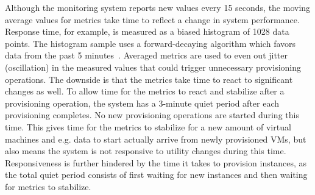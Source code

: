 \documentclass[english]{tktltiki2}
\theoremstyle{definition}
\theoremstyle{remark}
\begin{document}
Although the monitoring system reports new values every 15 seconds, the moving
average values for metrics take time to reflect a change in system
performance. Response time, for example, is measured as a biased histogram of
1028 data points. The histogram sample uses a forward-decaying algorithm which
favors data from the past 5
minutes~\cite{forwardDecayHistogram}\cite{codahaleHistogram}. Averaged metrics
are used to even out jitter (oscillation) in the measured values that could
trigger unnecessary provisioning operations. The downside is that the metrics
take time to react to significant changes as well. To allow time for the
metrics to react and stabilize after a provisioning operation, the system has
a 3-minute quiet period after each provisioning completes. No new provisioning
operations are started during this time. This gives time for the metrics to
stabilize for a new amount of virtual machines and e.g. data to start actually
arrive from newly provisioned VMs, but also means the system is not responsive
to utility changes during this time. Responsiveness is further hindered by the
time it takes to provision instances, as the total quiet period consists of
first waiting for new instances and then waiting for metrics to stabilize.

	\begin{table}[h]
	    \caption{Server applications and tools used in the prototype.}
	    \label{table:componentVersions}
	\end{table}
\end{document}

